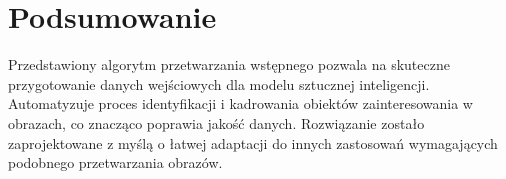 \section{Podsumowanie}

Przedstawiony algorytm przetwarzania wstępnego pozwala na skuteczne przygotowanie danych wejściowych dla modelu sztucznej inteligencji.
Automatyzuje proces identyfikacji i kadrowania obiektów zainteresowania w obrazach, co znacząco poprawia jakość danych.
Rozwiązanie zostało zaprojektowane z myślą o łatwej adaptacji do innych zastosowań wymagających podobnego przetwarzania obrazów.

